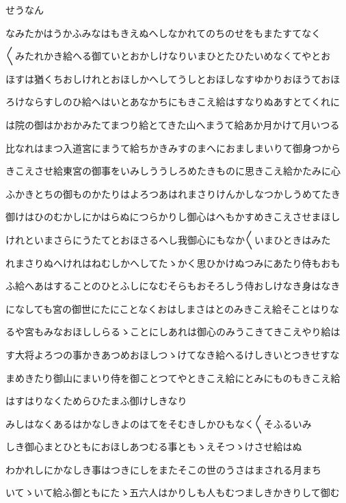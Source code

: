 \documentclass[a4paper,11pt,landscape]{ltjtarticle}
\begin{document}
\par\medskip
せうなん
\par\medskip
なみたかはうかふみなはもきえぬへしなかれてのちのせをもまたすてなく
\par\medskip
〱みたれかき給へる御ていとおかしけなりいまひとたひたいめなくてやとお
\par\medskip
ほすは猶くちおしけれとおほしかへしてうしとおほしなすゆかりおほうておほ
\par\medskip
ろけならすしのひ給へはいとあなかちにもきこえ給はすなりぬあすとてくれに
\par\medskip
は院の御はかおかみたてまつり給とてきた山へまうて給あか月かけて月いつる
\par\medskip
比なれはまつ入道宮にまうて給ちかきみすのまへにおましまいりて御身つから
\par\medskip
きこえさせ給東宮の御事をいみしううしろめたきものに思きこえ給かたみに心
\par\medskip
ふかきとちの御ものかたりはよろつあはれまさりけんかしなつかしうめてたき
\par\medskip
御けはひのむかしにかはらぬにつらかりし御心はへもかすめきこえさせまほし
\par\medskip
けれといまさらにうたてとおほさるへし我御心にもなか〱いまひときはみた
\par\medskip
れまさりぬへけれはねむしかへしてたゝかく思ひかけぬつみにあたり侍もおも
\par\medskip
ふ給へあはすることのひとふしになむそらもおそろしう侍おしけなき身はなき
\par\medskip
になしても宮の御世にたにことなくおはしまさはとのみきこえ給そことはりな
\par\medskip
るや宮もみなおほししらるゝことにしあれは御心のみうこきてきこえやり給は
\par\medskip
す大将よろつの事かきあつめおほしつゝけてなき給へるけしきいとつきせすな
\par\medskip
まめきたり御山にまいり侍を御ことつてやときこえ給にとみにものもきこえ給
\par\medskip
はすはりなくためらひたまふ御けしきなり
\par\medskip
みしはなくあるはかなしきよのはてをそむきしかひもなく〱そふるいみ
\par\medskip
しき御心まとひともにおほしあつむる事ともゝえそつゝけさせ給はぬ
\par\medskip
わかれしにかなしき事はつきにしをまたそこの世のうさはまされる月まち
\par\medskip
いてゝいて給ふ御ともにたゝ五六人はかりしも人もむつましきかきりして御む
\end{document}
